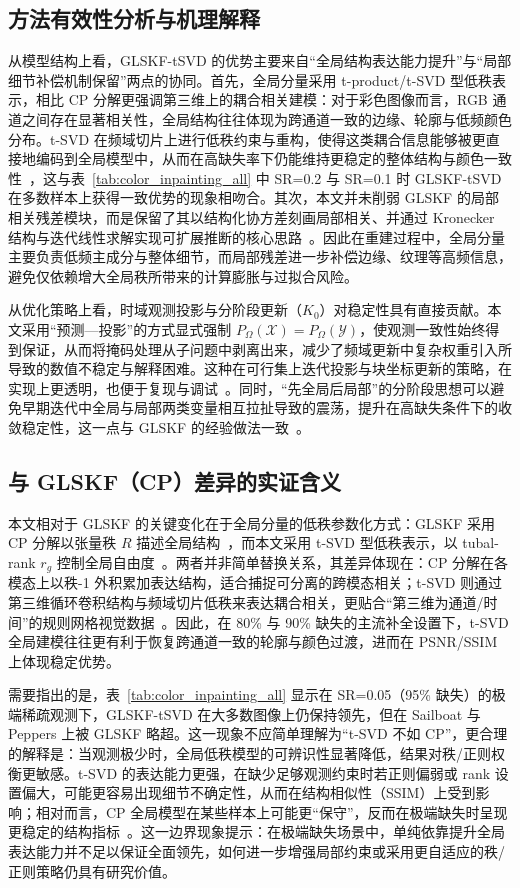 \documentclass[UTF8]{ctexart}
\begin{document}
\subsection{方法有效性分析与机理解释}
从模型结构上看，GLSKF-tSVD 的优势主要来自“全局结构表达能力提升”与“局部细节补偿机制保留”两点的协同。首先，全局分量采用 t-product/t-SVD 型低秩表示，相比 CP 分解更强调第三维上的耦合相关建模：对于彩色图像而言，RGB 通道之间存在显著相关性，全局结构往往体现为跨通道一致的边缘、轮廓与低频颜色分布。t-SVD 在频域切片上进行低秩约束与重构，使得这类耦合信息能够被更直接地编码到全局模型中，从而在高缺失率下仍能维持更稳定的整体结构与颜色一致性~\cite{zhang2017tsvd}，这与表~\ref{tab:color_inpainting_all} 中 SR=0.2 与 SR=0.1 时 GLSKF-tSVD 在多数样本上获得一致优势的现象相吻合。其次，本文并未削弱 GLSKF 的局部相关残差模块，而是保留了其以结构化协方差刻画局部相关、并通过 Kronecker 结构与迭代线性求解实现可扩展推断的核心思路~\cite{lei2024glskf}。因此在重建过程中，全局分量主要负责低频主成分与整体细节，而局部残差进一步补偿边缘、纹理等高频信息，避免仅依赖增大全局秩所带来的计算膨胀与过拟合风险。

从优化策略上看，时域观测投影与分阶段更新（$K_0$）对稳定性具有直接贡献。本文采用“预测—投影”的方式显式强制 $P_{\Omega}(\mathcal{X})=P_{\Omega}(\mathcal{Y})$，使观测一致性始终得到保证，从而将掩码处理从子问题中剥离出来，减少了频域更新中复杂权重引入所导致的数值不稳定与解释困难。这种在可行集上迭代投影与块坐标更新的策略，在实现上更透明，也便于复现与调试~\cite{lei2024glskf}。同时，“先全局后局部”的分阶段思想可以避免早期迭代中全局与局部两类变量相互拉扯导致的震荡，提升在高缺失条件下的收敛稳定性，这一点与 GLSKF 的经验做法一致~\cite{lei2024glskf}。

\subsection{与 GLSKF（CP）差异的实证含义}
本文相对于 GLSKF 的关键变化在于全局分量的低秩参数化方式：GLSKF 采用 CP 分解以张量秩 $R$ 描述全局结构~\cite{lei2024glskf}，而本文采用 t-SVD 型低秩表示，以 tubal-rank $r_g$ 控制全局自由度~\cite{zhang2017tsvd}。两者并非简单替换关系，其差异体现在：CP 分解在各模态上以秩-1 外积累加表达结构，适合捕捉可分离的跨模态相关；t-SVD 则通过第三维循环卷积结构与频域切片低秩来表达耦合相关，更贴合“第三维为通道/时间”的规则网格视觉数据~\cite{zhang2017tsvd}。因此，在 80\% 与 90\% 缺失的主流补全设置下，t-SVD 全局建模往往更有利于恢复跨通道一致的轮廓与颜色过渡，进而在 PSNR/SSIM 上体现稳定优势。

需要指出的是，表~\ref{tab:color_inpainting_all} 显示在 SR=0.05（95\% 缺失）的极端稀疏观测下，GLSKF-tSVD 在大多数图像上仍保持领先，但在 Sailboat 与 Peppers 上被 GLSKF 略超。这一现象不应简单理解为“t-SVD 不如 CP”，更合理的解释是：当观测极少时，全局低秩模型的可辨识性显著降低，结果对秩/正则权衡更敏感。t-SVD 的表达能力更强，在缺少足够观测约束时若正则偏弱或 rank 设置偏大，可能更容易出现细节不确定性，从而在结构相似性（SSIM）上受到影响；相对而言，CP 全局模型在某些样本上可能更“保守”，反而在极端缺失时呈现更稳定的结构指标~\cite{lei2024glskf}。这一边界现象提示：在极端缺失场景中，单纯依靠提升全局表达能力并不足以保证全面领先，如何进一步增强局部约束或采用更自适应的秩/正则策略仍具有研究价值。
\end{document}
